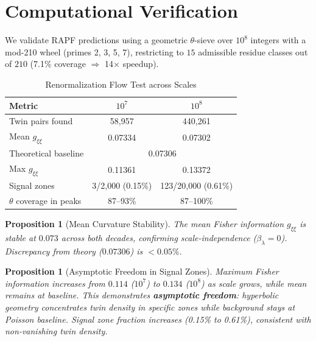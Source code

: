 \documentclass[12pt]{article}
\newtheorem{proposition}[theorem]{Proposition}
\begin{document}
\section{Computational Verification}
\label{sec:computation}

We validate RAPF predictions using a geometric $\theta$-sieve over $10^8$
integers with a mod-210 wheel (primes 2, 3, 5, 7), restricting to $15$
admissible residue classes out of $210$ (7.1\% coverage $\Rightarrow$ 14$\times$ speedup).

\begin{table}[htbp]
\centering
\caption{Renormalization Flow Test across Scales}
\label{tab:renormalization}
\begin{tabular}{lcc}
\hline
\textbf{Metric} & \textbf{$10^7$} & \textbf{$10^8$} \\
\hline
Twin pairs found & 58,957 & 440,261 \\
Mean $g_{\xi\xi}$ & 0.07334 & 0.07302 \\
Theoretical baseline & \multicolumn{2}{c}{0.07306} \\
Max $g_{\xi\xi}$ & 0.11361 & 0.13372 \\
Signal zones & 3/2,000 (0.15\%) & 123/20,000 (0.61\%) \\
$\theta$ coverage in peaks & 87--93\% & 87--100\% \\
\hline
\end{tabular}
\end{table}

\begin{proposition}[Mean Curvature Stability]
The mean Fisher information $g_{\xi\xi}$ is stable at $0.073$ across both
decades, confirming scale-independence ($\beta_\lambda = 0$). Discrepancy from
theory ($0.07306$) is $< 0.05\%$.
\end{proposition}

\begin{proposition}[Asymptotic Freedom in Signal Zones]
Maximum Fisher information increases from $0.114$ ($10^7$) to $0.134$ ($10^8$)
as scale grows, while mean remains at baseline. This demonstrates
\textbf{asymptotic freedom}: hyperbolic geometry concentrates twin density in
specific zones while background stays at Poisson baseline. Signal zone fraction
increases (0.15\% to 0.61\%), consistent with non-vanishing twin density.
\end{proposition}
\end{document}
